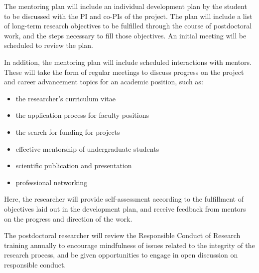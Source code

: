 \documentclass[hidelinks,11pt]{article}
\begin{document}
The mentoring plan will include an individual development plan by the student
to be discussed with the PI and co-PIs of the project.  The plan will include a
list of long-term research objectives to be fulfilled through the course of
postdoctoral work, and the steps necessary to fill those objectives. An initial
meeting will be scheduled to review the plan.


In addition, the mentoring plan will include scheduled interactions with
mentors. These will take the form of regular meetings to discuss progress on
the project and career advancement topics for an academic position, such as:

\begin{itemize}
\item the researcher's curriculum vitae
\item the application process for faculty positions
\item the search for funding for projects
\item effective mentorship of undergraduate students
\item scientific publication and presentation
\item professional networking
\end{itemize}

Here, the researcher will provide self-assessment according to
the fulfillment of objectives laid out in the development plan, and receive
feedback from mentors on the progress and direction of the work.

The postdoctoral researcher will review the Responsible Conduct of Research
training annually to encourage mindfulness of issues related to the integrity
of the research process, and be given opportunities to engage in open
discussion on responsible conduct.
\end{document}

